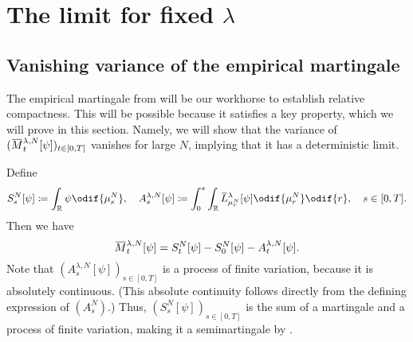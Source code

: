 \section{The limit for fixed \texorpdfstring{\( \lambda \)}{lambda}}


\subsection{Vanishing variance of the empirical martingale}
The empirical martingale from  will be our workhorse to establish relative compactness.
This will be possible because it satisfies a key property, which we will prove in this section.
Namely, we will show that the variance of \((\ol{M}_t^{\lambda,N}[\psi])_{t\in[0,T]}\) vanishes for large \(N\), implying that it has a deterministic limit.    %

Define
\begin{equation}
  S_s^N[\psi] \coloneqq \int_\potspace \psi \odif{\mu_s^N},
  \quad
  A_s^{\lambda, N}[\psi] \coloneqq \int_0^s \int_\potspace \ol{L}_{\mu_r^N}^{\lambda} [\psi] \odif{\mu_{r}^N} \odif{r}, \quad s \in [0,T].
\end{equation}
Then we have
\begin{equation}\label{eq:M=S-A}
  \ol{M}_t^{\lambda,N}[\psi] = S_t^N[\psi] - S_0^N[\psi] - A_t^{\lambda,N}[\psi].
\end{equation}
Note that \((A_s^{\lambda, N}[\psi])_{s\in[0,T]}\) is a process of finite variation, because it is absolutely continuous.
(This absolute continuity follows directly from the defining expression of \((A_s^N)\).) %
Thus, \((S_s^N[\psi])_{s\in[0,T]}\) is the sum of a martingale and a process of finite variation, making it a semimartingale by .

